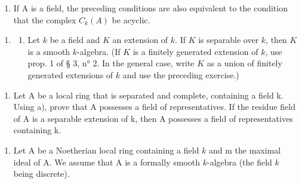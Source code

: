 \begin{enumerate}
\def\labelenumi{\alph{enumi})}
\setcounter{enumi}{1}
\tightlist
\item
  If A is a field, the preceding conditions are also equivalent to the condition that the complex \(C_{k}(A)\) be acyclic.
\end{enumerate}

\begin{enumerate}
\def\labelenumi{\arabic{enumi})}
\setcounter{enumi}{3}
\tightlist
\item
  \begin{enumerate}
  \def\labelenumii{\alph{enumii})}
  \tightlist
  \item
    Let \(k\) be a field and \(K\) an extension of \(k\). If \(K\) is separable over \(k\), then \(K\) is a smooth \(k\)-algebra. (If \(K\) is a finitely generated extension of \(k\), use prop. 1 of § 3, n° 2. In the general case, write \(K\) as a union of finitely generated extensions of \(k\) and use the preceding exercise.)
  \end{enumerate}
\end{enumerate}

\begin{enumerate}
\def\labelenumi{\alph{enumi})}
\setcounter{enumi}{1}
\tightlist
\item
  Let A be a local ring that is separated and complete, containing a field k. Using a), prove that A possesses a field of representatives. If the residue field of A is a separable extension of k, then A possesses a field of representatives containing k.
\end{enumerate}

\begin{enumerate}
\def\labelenumi{\arabic{enumi})}
\setcounter{enumi}{4}
\tightlist
\item
  Let A be a Noetherian local ring containing a field \(k\) and m the maximal ideal of A. We assume that A is a formally smooth \(k\)-algebra (the field \(k\) being discrete).
\end{enumerate}

